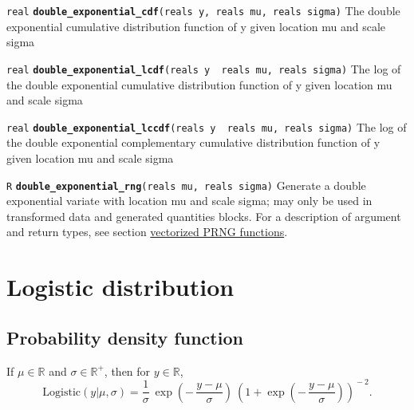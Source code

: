 \documentclass[
  10pt,
]{book}
\begin{document}

\texttt{real} \textbf{\texttt{double\_exponential\_cdf}}\texttt{(reals\ y,\ reals\ mu,\ reals\ sigma)}\newline
The double exponential cumulative distribution function of y given
location mu and scale sigma


\texttt{real} \textbf{\texttt{double\_exponential\_lcdf}}\texttt{(reals\ y\ \textbar{}\ reals\ mu,\ reals\ sigma)}\newline
The log of the double exponential cumulative distribution function of
y given location mu and scale sigma


\texttt{real} \textbf{\texttt{double\_exponential\_lccdf}}\texttt{(reals\ y\ \textbar{}\ reals\ mu,\ reals\ sigma)}\newline
The log of the double exponential complementary cumulative
distribution function of y given location mu and scale sigma


\texttt{R} \textbf{\texttt{double\_exponential\_rng}}\texttt{(reals\ mu,\ reals\ sigma)}\newline
Generate a double exponential variate with location mu and scale
sigma; may only be used in transformed data and generated quantities blocks. For a
description of argument and return types, see section
\protect\hyperlink{prng-vectorization}{vectorized PRNG functions}.

\hypertarget{logistic-distribution}{%
\section{Logistic distribution}\label{logistic-distribution}}

\hypertarget{probability-density-function-6}{%
\subsection{Probability density function}\label{probability-density-function-6}}

If \(\mu \in \mathbb{R}\) and \(\sigma \in \mathbb{R}^+\), then for \(y \in \mathbb{R}\), \[ \text{Logistic}(y|\mu,\sigma) = \frac{1}{\sigma} \
\exp\!\left( - \, \frac{y - \mu}{\sigma} \right) \ \left(1 + \exp
\!\left( - \, \frac{y - \mu}{\sigma} \right) \right)^{\!-2} \! . \]
\end{document}
